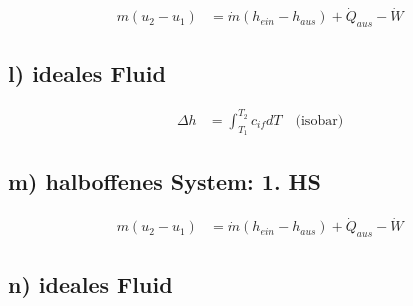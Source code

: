 \begin{align*}
    m(u_2 - u_1) &= \dot{m} (h_{ein} - h_{aus}) + \dot{Q}_{aus} - \dot{W}
\end{align*}

\subsection*{l) ideales Fluid}

\begin{align*}
    \Delta h &= \int_{T_1}^{T_2} c_{if} dT \quad \text{(isobar)}
\end{align*}

\subsection*{m) halboffenes System: 1. HS}

\begin{align*}
    m(u_2 - u_1) &= \dot{m} (h_{ein} - h_{aus}) + \dot{Q}_{aus} - \dot{W}
\end{align*}

\subsection*{n) ideales Fluid}

